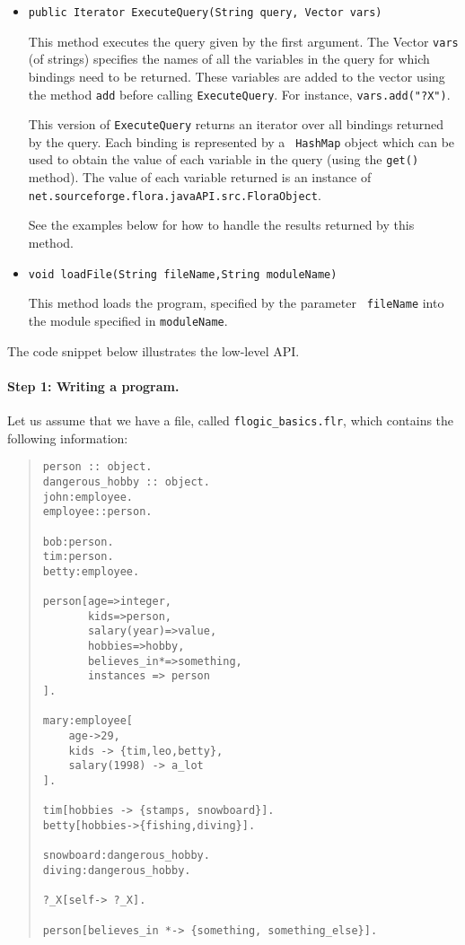 \begin{itemize}
\item
\begin{verbatim}
public Iterator ExecuteQuery(String query, Vector vars)
\end{verbatim}
  This method executes the \FLORA query given by the first argument. The
  Vector {\tt vars} (of strings) specifies the names of all the variables
  in the query for which bindings need to be returned. These variables are
  added to the vector using the method {\tt add} before calling
  {\tt ExecuteQuery}. For instance, {\tt vars.add("?X")}.  
  
  This version of {\tt ExecuteQuery} returns an iterator over all bindings
  returned by the \FLORA query.  Each binding is represented by a {\tt
    HashMap} 
  object which can be used to obtain the value of each variable in the
  query (using the {\tt get()} method). The value of each variable returned
  is an instance of {\tt
    net.sourceforge.flora.javaAPI.src.FloraObject}.

  See the examples below for how to handle the results
  returned by this method.

\item
\begin{verbatim}
void loadFile(String fileName,String moduleName)
\end{verbatim}
  This method loads the \FLORA program, specified by the parameter {\tt
    fileName} into the \FLORA module specified in {\tt moduleName}.
\end{itemize}

The code snippet below illustrates the low-level API.

\paragraph{Step 1: Writing a \FLORA program.}
  Let us assume that we have a file, called  {\tt flogic\_basics.flr},
  which contains the following information:
\begin{quote}
\begin{verbatim}
person :: object.
dangerous_hobby :: object.
john:employee.
employee::person.

bob:person.
tim:person.
betty:employee.

person[age=>integer,
       kids=>person,
       salary(year)=>value,
       hobbies=>hobby,
       believes_in*=>something,
       instances => person
].

mary:employee[
    age->29,
    kids -> {tim,leo,betty},
    salary(1998) -> a_lot
].

tim[hobbies -> {stamps, snowboard}].
betty[hobbies->{fishing,diving}].

snowboard:dangerous_hobby.
diving:dangerous_hobby.

?_X[self-> ?_X].

person[believes_in *-> {something, something_else}].
\end{verbatim}
\end{quote}

